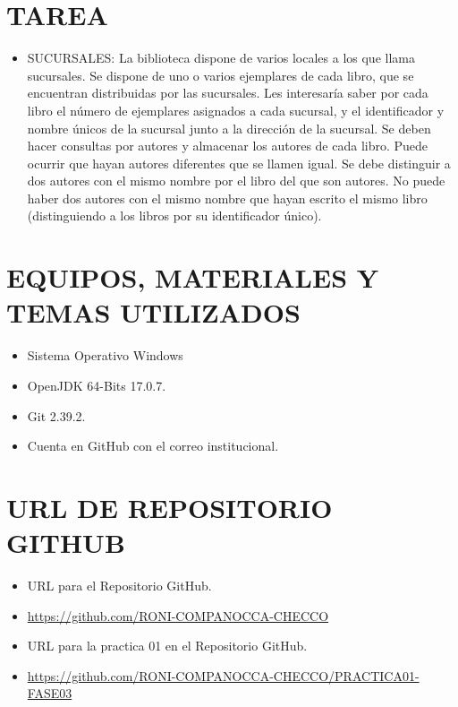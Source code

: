 \documentclass{article}
\begin{document}
    \section{TAREA}
	\begin{itemize}	
    \item SUCURSALES: La biblioteca dispone de varios locales a los que llama sucursales. Se dispone de uno o varios ejemplares de cada libro, que se encuentran distribuidas por las sucursales. Les interesaría saber por cada libro el número de ejemplares asignados a cada sucursal, y el identificador y nombre únicos de la sucursal junto a la dirección de la sucursal. Se deben hacer consultas por autores y almacenar los autores de cada libro. Puede ocurrir que hayan autores diferentes que se llamen igual. Se debe distinguir a dos autores con el mismo nombre por el libro del que son autores. No puede haber dos autores con el mismo nombre que hayan escrito el mismo libro (distinguiendo a los libros por su identificador único).


    \end{itemize}

    \section{EQUIPOS, MATERIALES Y TEMAS UTILIZADOS}
	\begin{itemize}
		\item Sistema Operativo Windows
		\item OpenJDK 64-Bits 17.0.7.
		\item Git 2.39.2.	
  	\item Cuenta en GitHub con el correo institucional.
	\end{itemize}

    \section{URL DE REPOSITORIO GITHUB}
	\begin{itemize}
		\item URL para el Repositorio GitHub.
		\item \url{https://github.com/RONI-COMPANOCCA-CHECCO}
		\item URL para la practica 01 en el Repositorio GitHub.	
        \item \url{https://github.com/RONI-COMPANOCCA-CHECCO/PRACTICA01-FASE03}
	\end{itemize}
    
\end{document}

